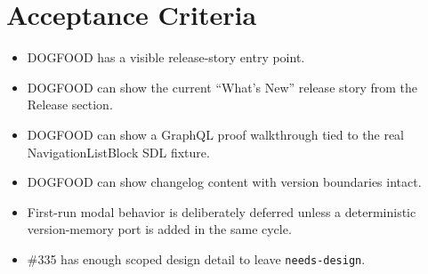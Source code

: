 \section{Acceptance Criteria}\label{record-118-acceptance-criteria}

\begin{itemize}
\tightlist
\item
  DOGFOOD has a visible release-story entry point.
\item
  DOGFOOD can show the current ``What's New'' release story from the Release section.
\item
  DOGFOOD can show a GraphQL proof walkthrough tied to the real NavigationListBlock SDL fixture.
\item
  DOGFOOD can show changelog content with version boundaries intact.
\item
  First-run modal behavior is deliberately deferred unless a deterministic version-memory port is added in the same cycle.
\item
  \#335 has enough scoped design detail to leave \texttt{n\allowbreak{}e\allowbreak{}e\allowbreak{}d\allowbreak{}s\allowbreak{}-\allowbreak{}d\allowbreak{}e\allowbreak{}s\allowbreak{}i\allowbreak{}g\allowbreak{}n}.
\end{itemize}

